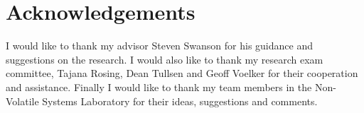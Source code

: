 \section{Acknowledgements}
\label{sec:acknowledge}

I would like to thank my advisor Steven Swanson for his guidance and suggestions
on the research. I would also like to thank my research exam committee, Tajana
Rosing, Dean Tullsen and Geoff Voelker for their cooperation and assistance.
Finally I would like to thank my team members in the Non-Volatile Systems
Laboratory for their ideas, suggestions and comments.

